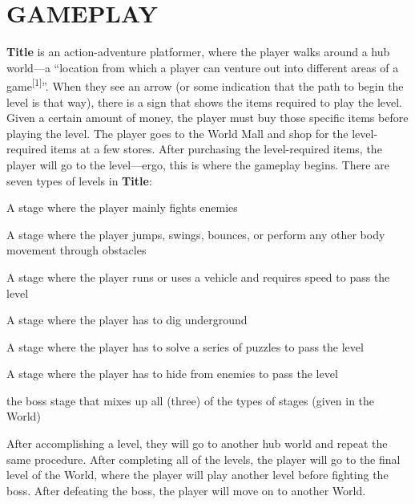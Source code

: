 \documentclass[11pt]{article}
\begin{document}
	\section*{GAMEPLAY}
	\textbf{Title} is an action-adventure platformer, where the player walks around a hub world---a ``location from which a player can venture out into different areas of a game\textsuperscript{[1]}''. When they see an arrow (or some indication that the path to begin the level is that way), there is a sign that shows the items required to play the level. Given a certain amount of money, the player must buy those specific items before playing the level. The player goes to the World Mall and shop for the level-required items at a few stores. \newline \newline
	After purchasing the level-required items, the player will go to the level---ergo, this is where the gameplay begins. There are seven types of levels in \textbf{Title}:
	\begin{description}[align=right,labelwidth=3cm,noitemsep]
		\item [Fight Level:] A stage where the player mainly fights enemies
		\item [Platform Level:] A stage where the player jumps, swings, bounces, or perform any other body movement through obstacles
		\item [Speed Level:] A stage where the player runs or uses a vehicle and requires speed to pass the level
		\item [Dig Level:] A stage where the player has to dig underground
		\item [Puzzle Level:] A stage where the player has to solve a series of puzzles to pass the level
		\item [Stealth Level:] A stage where the player has to hide from enemies to pass the level
		\item [Combo Level:] the boss stage that mixes up all (three) of the types of stages (given in the World)
	\end{description}
	After accomplishing a level, they will go to another hub world and repeat the same procedure. After completing all of the levels, the player will go to the final level of the World, where the player will play another level before fighting the boss. After defeating the boss, the player will move on to another World.
\end{document}
